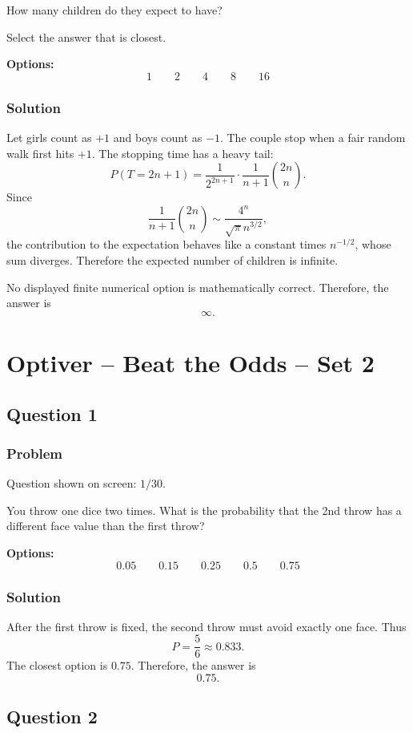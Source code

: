 \documentclass[12pt]{article}
\begin{document}
How many children do they expect to have?

Select the answer that is closest.

\noindent\textbf{Options:}
\[
\boxed{1}
\qquad
\boxed{2}
\qquad
\boxed{4}
\qquad
\boxed{8}
\qquad
\boxed{16}
\]

\subsubsection{Solution}
Let girls count as \(+1\) and boys count as \(-1\). The couple stop when a fair random walk first hits \(+1\). The stopping time has a heavy tail:
\[
P(T=2n+1)=\frac{1}{2^{2n+1}}\cdot \frac{1}{n+1}\binom{2n}{n}.
\]
Since
\[
\frac{1}{n+1}\binom{2n}{n}\sim \frac{4^n}{\sqrt{\pi}n^{3/2}},
\]
the contribution to the expectation behaves like a constant times \(n^{-1/2}\), whose sum diverges. Therefore the expected number of children is infinite.

No displayed finite numerical option is mathematically correct. Therefore, the answer is
\[
\boxed{\infty}.
\]

\newpage
\section{Optiver -- Beat the Odds -- Set 2}

\subsection{Question 1}
\subsubsection{Problem}
Question shown on screen: \(1/30\).

You throw one dice two times. What is the probability that the 2nd throw has a different face value than the first throw?

\noindent\textbf{Options:}
\[
\boxed{0.05}
\qquad
\boxed{0.15}
\qquad
\boxed{0.25}
\qquad
\boxed{0.5}
\qquad
\boxed{0.75}
\]

\subsubsection{Solution}
After the first throw is fixed, the second throw must avoid exactly one face. Thus
\[
P=\frac{5}{6}\approx 0.833.
\]
The closest option is \(0.75\). Therefore, the answer is
\[
\boxed{0.75}.
\]

\subsection{Question 2}
\end{document}
